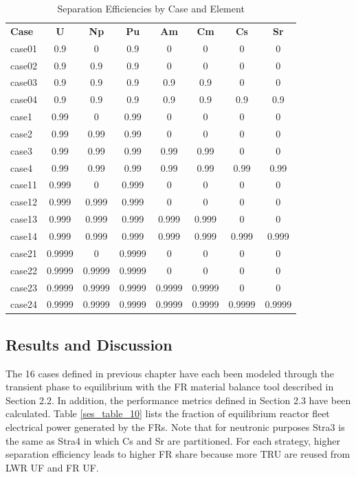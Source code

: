 \begin{table}[htbp]
\begin{center}
\caption{Separation Efficiencies by Case and Element}
\label{ses_table8}
\begin{tabular}{|l|c|c|c|c|c|c|c|}
\hline
\textbf{Case} & \textbf{U} & \textbf{Np} & \textbf{Pu} & \textbf{Am} & \textbf{Cm} & \textbf{Cs} & \textbf{Sr} \\
case01 & 0.9    & 0      & 0.9    & 0      & 0      & 0      & 0      \\
case02 & 0.9    & 0.9    & 0.9    & 0      & 0      & 0      & 0      \\
case03 & 0.9    & 0.9    & 0.9    & 0.9    & 0.9    & 0      & 0      \\
case04 & 0.9    & 0.9    & 0.9    & 0.9    & 0.9    & 0.9    & 0.9    \\
case1  & 0.99   & 0      & 0.99   & 0      & 0      & 0      & 0      \\
case2  & 0.99   & 0.99   & 0.99   & 0      & 0      & 0      & 0      \\
case3  & 0.99   & 0.99   & 0.99   & 0.99   & 0.99   & 0      & 0      \\
case4  & 0.99   & 0.99   & 0.99   & 0.99   & 0.99   &0.99    & 0.99   \\
case11 & 0.999  & 0      & 0.999  & 0      & 0      & 0      & 0      \\
case12 & 0.999  & 0.999  & 0.999  & 0      & 0      & 0      & 0      \\
case13 & 0.999  & 0.999  & 0.999  & 0.999  & 0.999  & 0      & 0      \\
case14 & 0.999  & 0.999  & 0.999  & 0.999  & 0.999  & 0.999  & 0.999  \\
case21 & 0.9999 & 0      & 0.9999 & 0      & 0      & 0      & 0      \\
case22 & 0.9999 & 0.9999 & 0.9999 & 0      & 0      & 0      & 0      \\
case23 & 0.9999 & 0.9999 & 0.9999 & 0.9999 & 0.9999 & 0      & 0      \\
case24 & 0.9999 & 0.9999 & 0.9999 & 0.9999 & 0.9999 & 0.9999 & 0.9999 \\
\hline
\end{tabular}
\end{center}
\end{table}



\subsection{Results and Discussion}
\label{ses_sec:res_disc}
The 16 cases defined in previous chapter have each been modeled through
the transient phase to equilibrium with the FR material balance tool
described in Section 2.2.  In addition, the performance metrics defined
in Section 2.3 have been calculated.  Table \ref{ses_table_10} lists the fraction of
equilibrium reactor fleet electrical power generated by the FRs.  Note
that for neutronic purposes Stra3 is the same as Stra4 in which Cs and
Sr are partitioned.  For each strategy, higher separation efficiency
leads to higher FR share because more TRU are reused from LWR UF and FR
UF.  

